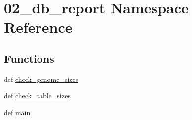 \hypertarget{namespace02__db__report}{\section{02\-\_\-db\-\_\-report Namespace Reference}
\label{namespace02__db__report}
}
\subsection*{Functions}
\begin{DoxyCompactItemize}
\item 
def \hyperlink{namespace02__db__report_aaca979076fe0caf53dd0984714121c16}{check\-\_\-genome\-\_\-sizes}
\item 
def \hyperlink{namespace02__db__report_afc8337e74ecde2fe7f8c66afa0b1e376}{check\-\_\-table\-\_\-sizes}
\item 
def \hyperlink{namespace02__db__report_a396975781a348ccd49bde28a3c92d4a0}{main}
\end{DoxyCompactItemize}


